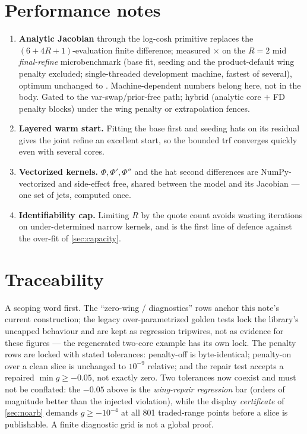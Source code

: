 \documentclass[11pt]{article}
\begin{document}
\section{Performance notes}
\label{app:perf}

\begin{enumerate}[leftmargin=1.6em]
\item \textbf{Analytic Jacobian} through the log-cosh primitive replaces the
$(6+4R+1)$-evaluation finite difference; measured \mcscorrspeedup$\times$ on the
$R=2$ mid \emph{final-refine} microbenchmark (base fit, seeding and the
product-default wing penalty excluded; single-threaded development machine,
fastest of several), optimum unchanged to \mcscorrcostdiff.  Machine-dependent
numbers belong here, not in the body.  Gated to the var-swap/prior-free path;
hybrid (analytic core $+$ FD penalty blocks) under the wing penalty or
extrapolation fences.
\item \textbf{Layered warm start.}  Fitting the base first and seeding hats on
its residual gives the joint refine an excellent start, so the bounded trf
converges quickly even with several cores.
\item \textbf{Vectorized kernels.}  $\Phi,\Phi',\Phi''$ and the hat second
differences are NumPy-vectorized and side-effect free, shared between the model
and its Jacobian --- one set of jets, computed once.
\item \textbf{Identifiability cap.}  Limiting $R$ by the quote count avoids
wasting iterations on under-determined narrow kernels, and is the first line of
defence against the over-fit of \cref{sec:capacity}.
\end{enumerate}

\section{Traceability}
\label{app:trace}

A scoping word first.  The ``zero-wing / diagnostics'' rows anchor this note's
current construction; the legacy over-parametrized golden tests lock the
library's uncapped behaviour and are kept as regression tripwires, not as
evidence for these figures --- the regenerated two-core example has its own lock.
The penalty rows are locked with stated tolerances: penalty-off is
byte-identical; penalty-on over a clean slice is unchanged to $10^{-9}$
relative; and the repair test accepts a repaired $\min g\ge-0.05$, not exactly
zero.  Two tolerances now coexist and must not be conflated: the $-0.05$
above is the \emph{wing-repair regression} bar (orders of magnitude better
than the injected violation), while the display \emph{certificate} of
\cref{sec:noarb} demands $g\ge-10^{-4}$ at all 801 traded-range points
before a slice is publishable.  A finite diagnostic grid is not a global
proof.
\end{document}
